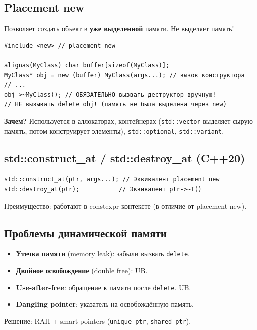 \documentclass[12pt,a4paper]{article}
\begin{document}
\subsection{Placement new}

Позволяет создать объект в \textbf{уже выделенной} памяти. Не выделяет память!

\begin{lstlisting}
#include <new> // placement new

alignas(MyClass) char buffer[sizeof(MyClass)];
MyClass* obj = new (buffer) MyClass(args...); // вызов конструктора
// ...
obj->~MyClass(); // ОБЯЗАТЕЛЬНО вызвать деструктор вручную!
// НЕ вызывать delete obj! (память не была выделена через new)
\end{lstlisting}

\textbf{Зачем?} Используется в аллокаторах, контейнерах (\texttt{std::vector} выделяет сырую память, потом конструирует элементы), \texttt{std::optional}, \texttt{std::variant}.

\subsection{std::construct\_at / std::destroy\_at (C++20)}

\begin{lstlisting}
std::construct_at(ptr, args...); // Эквивалент placement new
std::destroy_at(ptr);           // Эквивалент ptr->~T()
\end{lstlisting}
Преимущество: работают в constexpr-контексте (в отличие от placement new).

\subsection{Проблемы динамической памяти}

\begin{itemize}
    \item \textbf{Утечка памяти} (memory leak): забыли вызвать \texttt{delete}.
    \item \textbf{Двойное освобождение} (double free): UB.
    \item \textbf{Use-after-free}: обращение к памяти после \texttt{delete}. UB.
    \item \textbf{Dangling pointer}: указатель на освобождённую память.
\end{itemize}

Решение: RAII + smart pointers (\texttt{unique\_ptr}, \texttt{shared\_ptr}).
\end{document}
